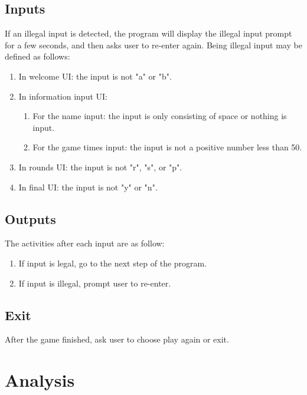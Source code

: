 \documentclass[12pt]{article}
\begin{document}
	\subsection{Inputs}
	If an illegal input is detected, the program will display the illegal input prompt for a few seconds, and then asks user to re-enter again. Being illegal input may be defined as follows:
	
	\begin{enumerate}
	\item In welcome UI: the input is not "a" or "b".
	\item In information input UI:
	
		\begin{enumerate}[1)]
		\item For the name input: the input is only consisting of space or nothing is input.
		\item For the game times input: the input is not a positive number less than 50.
		\end{enumerate}
	
	\item In rounds UI: the input is not "r", "s", or "p".
	\item In final UI: the input is not "y" or "n".
	\end{enumerate}

	\subsection{Outputs}
	The activities after each input are as follow:
	
	\begin{enumerate}
	\item If input is legal, go to the next step of the program.	
	\item If input is illegal, prompt user to re-enter.
	\end{enumerate}
	
	\subsection{Exit}
	After the game finished, ask user to choose play again or exit.

	\section{Analysis}
	
\end{document}
